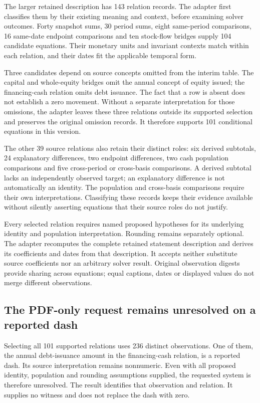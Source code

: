 The larger retained description has 143 relation records. The adapter first
classifies them by their existing meaning and context, before examining solver
outcomes. Forty snapshot sums, 30 period sums, eight same-period comparisons,
16 same-date endpoint comparisons and ten stock-flow bridges supply 104
candidate equations. Their monetary units and invariant contexts match within
each relation, and their dates fit the applicable temporal form.

Three candidates depend on source concepts omitted from the interim table.
The capital and whole-equity bridges omit the annual concept of equity issued;
the financing-cash relation omits debt issuance. The fact that a row is absent
does not establish a zero movement. Without a separate interpretation for those
omissions, the adapter leaves these three relations outside its supported
selection and preserves the original omission records. It therefore supports
101 conditional equations in this version.

The other 39 source relations also retain their distinct roles: six derived
subtotals, 24 explanatory differences, two endpoint differences, two cash
population comparisons and five cross-period or cross-basis comparisons.
A derived subtotal lacks an independently observed target; an explanatory
difference is not automatically an identity. The population and cross-basis
comparisons require their own interpretations. Classifying these records keeps
their evidence available without silently asserting equations that their
source roles do not justify.

Every selected relation requires named proposed hypotheses for its underlying
identity and population interpretation. Rounding remains separately optional.
The adapter recomputes the complete retained statement description and derives
its coefficients and dates from that description. It accepts neither substitute
source coefficients nor an arbitrary solver result. Original observation digests
provide sharing across equations; equal captions, dates or displayed values do
not merge different observations.

\subsection{The PDF-only request remains unresolved on a reported dash}

Selecting all 101 supported relations uses 236 distinct observations. One of
them, the annual debt-issuance amount in the financing-cash relation, is a
reported dash. Its source interpretation remains nonnumeric. Even with all
proposed identity, population and rounding assumptions supplied, the requested
system is therefore unresolved. The result identifies that observation and
relation. It supplies no witness and does not replace the dash with zero.

